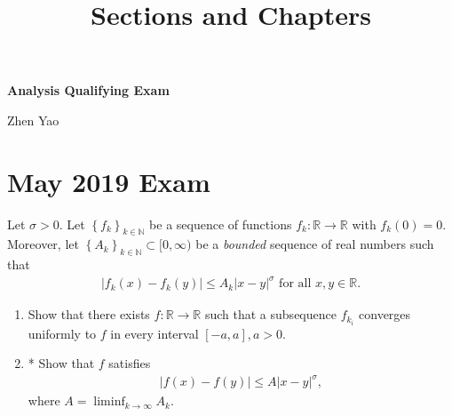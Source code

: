 \documentclass[11pt]{article}
\title{Sections and Chapters}
\theoremstyle{definition}
\numberwithin{equation}{subsection}
\begin{document}
\centerline{\Large \bf Analysis Qualifying Exam}
\centerline{Zhen Yao}

\bigskip

\section{May 2019 Exam}

Let $\sigma > 0$. Let $\left\{f_k\right\}_{k\in \mathbb{N}}$ be a sequence of functions $f_k: \mathbb{R} \to \mathbb{R}$ with $f_k(0) = 0$. Moreover, let $\left\{A_k\right\}_{k\in \mathbb{N}} \subset [0,\infty)$ be a {\it bounded} sequence of real numbers such that 
\begin{align*}
    \left|f_k(x) - f_k(y)\right| \leq A_k |x - y|^\sigma \,\, \text{for all} \,\, x, y\in \mathbb{R}.
\end{align*}
\begin{enumerate}[label=(\alph*)]
    \item Show that there exists $f: \mathbb{R}\to \mathbb{R}$ such that a subsequence $f_{k_i}$ converges uniformly to $f$ in every interval $[-a,a], a > 0$.
    
    \item* Show that $f$ satisfies 
    \begin{align*}
        |f(x) - f(y)| \leq A|x - y|^\sigma,
    \end{align*}
    where $A = \liminf_{k\to\infty}A_k$.
\end{enumerate}
\end{document}
